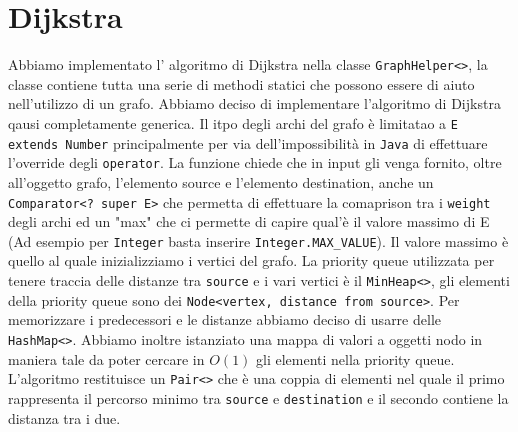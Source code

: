 \documentclass[letterpaper]{report}
\begin{document}
\section{Dijkstra}
Abbiamo implementato l' algoritmo di Dijkstra nella classe \verb|GraphHelper<>|, 
la classe contiene tutta una serie di methodi statici che possono essere di aiuto 
nell'utilizzo di un grafo. \newline
Abbiamo deciso di implementare l'algoritmo di Dijkstra qausi completamente generica.
Il itpo degli archi del grafo è limitatao a \verb|E extends Number| principalmente 
per via dell'impossibilità in \verb|Java| di effettuare l'override degli \verb|operator|.
\newline
La funzione chiede che in input gli venga fornito, oltre all'oggetto grafo, l'elemento 
source e l'elemento destination, anche un \verb|Comparator<? super E>| che 
permetta di effettuare la comaprison tra i \verb|weight| degli archi ed un "max" che ci 
permette di capire qual'è il valore massimo di E (Ad esempio per \verb|Integer| basta inserire 
\verb|Integer.MAX_VALUE|). Il valore massimo è quello al quale inizializziamo i vertici del grafo. \newline
La priority queue utilizzata per tenere traccia delle distanze tra \verb|source| e
i vari vertici è il \verb|MinHeap<>|, gli elementi della priority queue sono dei\newline 
\verb|Node<vertex, distance from source>|.
Per memorizzare i predecessori e le distanze abbiamo deciso di usarre delle 
\verb|HashMap<>|. \newline
Abbiamo inoltre istanziato una mappa di valori a oggetti nodo in maniera tale da 
poter cercare in $O(1)$ gli elementi nella priority queue. \newline
L'algoritmo restituisce un \verb|Pair<>| che è una coppia di elementi nel quale il
primo rappresenta il percorso minimo tra \verb|source| e \verb|destination| e il 
secondo contiene la distanza tra i due.
\end{document}
